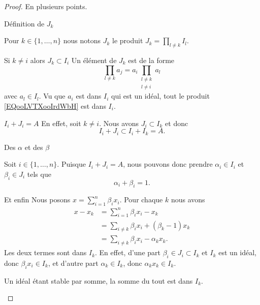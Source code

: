 \begin{proof}
	En plusieurs points.
	\begin{subproof}
		\item[Définition de \( J_k\)]

		Pour \( k\in\{ 1,\ldots,n \}\) nous notons \( J_k\) le produit \( J_k=\prod_{l\neq k}I_l\).

		\item[Si \( k\neq i\) alors \( J_k\subset I_i\)]
		Un élément de \( J_k\) est de la forme
		\begin{equation}        \label{EQooLVTXooIrdWbH}
			\prod_{l\neq k}a_j=a_i\prod_{\substack{l\neq k\\l\neq i}}a_l
		\end{equation}
		avec \( a_l\in I_l\). Vu que \( a_i\) est dans \( I_i\) qui est un idéal, tout le produit \eqref{EQooLVTXooIrdWbH} est dans \( I_i\).
		\item[\( I_i+J_i=A\)]
		En effet, soit \( k\neq i\). Nous avons \( J_i\subset  I_k\) et donc
		\begin{equation}
			I_i+J_i\subset I_i+I_k=A.
		\end{equation}

		\item[Des \( \alpha\) et des \( \beta\)]

		Soit \( i\in \{ 1,\ldots, n \}\). Puisque \( I_i+J_i=A\), nous pouvons donc prendre \( \alpha_i\in I_i\) et \( \beta_i\in J_i\) tels que
		\begin{equation}
			\alpha_i+\beta_i = 1.
		\end{equation}

		\item[Et enfin]
		Nous posons \( x=\sum_{i=1}^n\beta_ix_i\). Pour chaque \( k\) nous avons
		\begin{subequations}
			\begin{align}
				x-x_k & =\sum_{i=1}^n\beta_ix_i-x_k              \\
				      & =\sum_{i\neq k}\beta_ix_i+(\beta_k-1)x_k \\
				      & =\sum_{i\neq k}\beta_ix_i-\alpha_kx_k.
			\end{align}
		\end{subequations}
		Les deux termes sont dans \( I_k\). En effet, d'une part \( \beta_i\in J_i\subset I_k\) et \( I_k\) est un idéal, donc \( \beta_ix_i\in I_k\), et d'autre part \( \alpha_k\in I_k\), donc \( \alpha_kx_k\in I_k\).

		Un idéal étant stable par somme, la somme du tout est dans \( I_k\).
	\end{subproof}
\end{proof}

